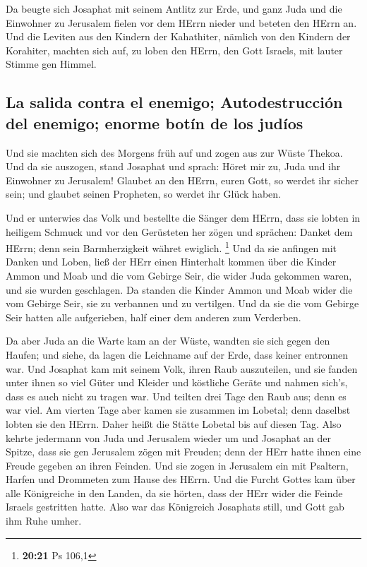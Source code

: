  Da beugte sich Josaphat mit seinem Antlitz zur Erde, und
ganz Juda und die Einwohner zu Jerusalem fielen vor dem HErrn nieder und
beteten den HErrn an.  Und die Leviten aus den Kindern
der Kahathiter, nämlich von den Kindern der Korahiter, machten sich auf,
zu loben den HErrn, den Gott Israels, mit lauter Stimme gen Himmel.

\hypertarget{la-salida-contra-el-enemigo-autodestrucciuxf3n-del-enemigo-enorme-botuxedn-de-los-juduxedos}{%
\subsection{La salida contra el enemigo; Autodestrucción del enemigo;
enorme botín de los
judíos}\label{la-salida-contra-el-enemigo-autodestrucciuxf3n-del-enemigo-enorme-botuxedn-de-los-juduxedos}}

 Und sie machten sich des Morgens früh auf und zogen aus
zur Wüste Thekoa. Und da sie auszogen, stand Josaphat und sprach: Höret
mir zu, Juda und ihr Einwohner zu Jerusalem! Glaubet an den HErrn, euren
Gott, so werdet ihr sicher sein; und glaubet seinen Propheten, so werdet
ihr Glück haben.

 Und er unterwies das Volk und bestellte die Sänger dem
HErrn, dass sie lobten in heiligem Schmuck und vor den Gerüsteten her
zögen und sprächen: Danket dem HErrn; denn sein Barmherzigkeit währet
ewiglich. \footnote{\textbf{20:21} Ps 106,1}  Und da sie
anfingen mit Danken und Loben, ließ der HErr einen Hinterhalt kommen
über die Kinder Ammon und Moab und die vom Gebirge Seir, die wider Juda
gekommen waren, und sie wurden geschlagen.  Da standen
die Kinder Ammon und Moab wider die vom Gebirge Seir, sie zu verbannen
und zu vertilgen. Und da sie die vom Gebirge Seir hatten alle
aufgerieben, half einer dem anderen zum Verderben.

 Da aber Juda an die Warte kam an der Wüste, wandten sie
sich gegen den Haufen; und siehe, da lagen die Leichname auf der Erde,
dass keiner entronnen war.  Und Josaphat kam mit seinem
Volk, ihren Raub auszuteilen, und sie fanden unter ihnen so viel Güter
und Kleider und köstliche Geräte und nahmen sich's, dass es auch nicht
zu tragen war. Und teilten drei Tage den Raub aus; denn es war viel.
 Am vierten Tage aber kamen sie zusammen im Lobetal; denn
daselbst lobten sie den HErrn. Daher heißt die Stätte Lobetal bis auf
diesen Tag.  Also kehrte jedermann von Juda und Jerusalem
wieder um und Josaphat an der Spitze, dass sie gen Jerusalem zögen mit
Freuden; denn der HErr hatte ihnen eine Freude gegeben an ihren Feinden.
 Und sie zogen in Jerusalem ein mit Psaltern, Harfen und
Drommeten zum Hause des HErrn.  Und die Furcht Gottes kam
über alle Königreiche in den Landen, da sie hörten, dass der HErr wider
die Feinde Israels gestritten hatte.  Also war das
Königreich Josaphats still, und Gott gab ihm Ruhe umher.

